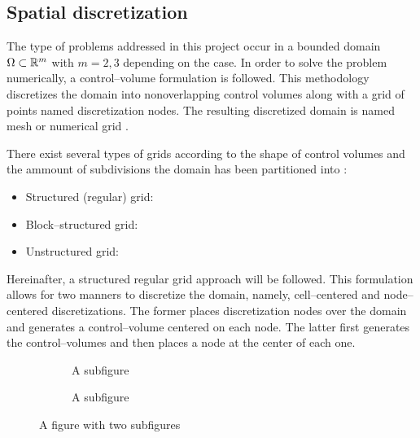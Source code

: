 
\subsection{Spatial discretization}

The type of problems addressed in this project occur in a bounded domain $\Omega \subset \mathbb{R}^m$ with $m = 2, 3$ depending on the case. In order to solve the problem numerically, a control--volume formulation is followed. This methodology discretizes the domain into nonoverlapping control volumes along with a grid of points named discretization nodes. The resulting discretized domain is named mesh or numerical grid \cite{patankar2008numerical}.

There exist several types of grids according to the shape of control volumes and the ammount of subdivisions the domain has been partitioned into \cite{ferziger2002computational}:
\begin{itemize}
	\item Structured (regular) grid: 
	\item Block--structured grid:
	\item Unstructured grid:
\end{itemize}

Hereinafter, a structured regular grid approach will be followed. This formulation allows for two manners to discretize the domain, namely, cell--centered and node--centered discretizations. The former places discretization nodes over the domain and generates a control--volume centered on each node. The latter first generates the control--volumes and then places a node at the center of each one.

\begin{figure}[h]
	\centering
	\begin{subfigure}{.5\textwidth}
		\centering
		\caption{A subfigure}
		\label{fig:sub1}
	\end{subfigure}%
	\begin{subfigure}{.5\textwidth}
		\centering
		\caption{A subfigure}
		\label{fig:sub2}
	\end{subfigure}
	\caption{A figure with two subfigures}
	\label{fig:face_node_centered_discretization_comparison}
\end{figure}